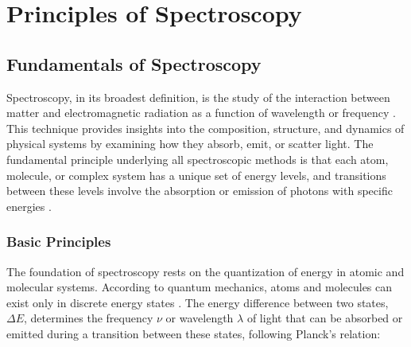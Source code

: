 \chapter{Principles of Spectroscopy}
\label{chapter_spectroscopy}

\section{Fundamentals of Spectroscopy}
\label{sec:spectroscopy_fundamentals}



\noindent Spectroscopy, in its broadest definition, is the study of the interaction between matter and electromagnetic radiation as a function of wavelength or frequency \cite{berman2011principleslaserspectroscopy, mukamel1995principlesnonlinearoptical}.
This technique provides insights into the composition, structure, and dynamics of physical systems by examining how they absorb, emit, or scatter light. The fundamental principle underlying all spectroscopic methods is that each atom, molecule, or complex system has a unique set of energy levels, and transitions between these levels involve the absorption or emission of photons with specific energies \cite{boyd2008chapter1nonlinear}.

\subsection{Basic Principles}
\label{subsec:basic_principles}

\noindent The foundation of spectroscopy rests on the quantization of energy in atomic and molecular systems. According to quantum mechanics, atoms and molecules can exist only in discrete energy states \cite{albashetal2012quantumadiabaticmarkovian}. The energy difference between two states, $\Delta E$, determines the frequency $\nu$ or wavelength $\lambda$ of light that can be absorbed or emitted during a transition between these states, following Planck's relation:

